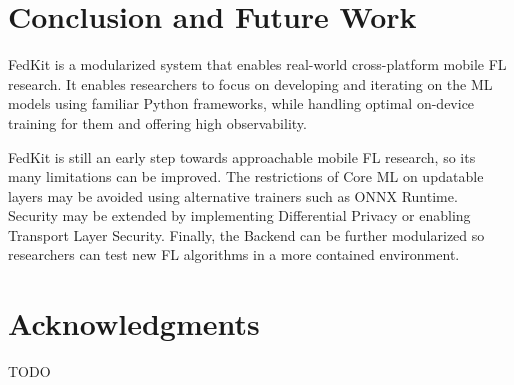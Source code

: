 \documentclass[letterpaper]{article} %
\begin{document}

\section{Conclusion and Future Work}

FedKit is a modularized system that enables real-world cross-platform
mobile FL research.
It enables researchers to focus on developing and iterating on the ML models
using familiar Python frameworks,
while handling optimal on-device training for them and
offering high observability.

FedKit is still an early step towards approachable mobile FL research,
so its many limitations can be improved.
The restrictions of Core ML on updatable layers may be avoided
using alternative trainers such as ONNX Runtime.
Security may be extended by implementing Differential Privacy or
enabling Transport Layer Security.
Finally, the Backend can be further modularized so researchers can
test new FL algorithms in a more contained environment.

\appendix

\section*{Acknowledgments}
TODO

\bigskip


\end{document}

